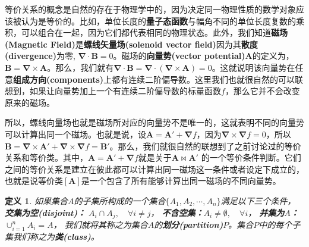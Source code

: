 \documentclass[mathserif,hyperref,UTF8,openany,b5paper]{ctexbook}
\newtheorem{defn}{定义}[section]
\begin{document}
等价关系的概念是自然的存在于物理学中的，因为决定同一物理性质的数学对象应该被认为是等价的。比如，单位长度的\textbf{量子态函数}与幅角不同的单位长度复数的乘积，可以组合在一起，因为它们都代表相同的物理状态。此外，我们知道\textbf{磁场(Magnetic Field)}是\textbf{螺线矢量场(solenoid vector field)}因为其\textbf{散度(divergence)}为零, $\mathbf{\nabla} \cdot \mathbf{B} = 0 $。磁场的\textbf{向量势(vector potential)}$\mathbf{A}$的定义为，$ \mathbf{B} = \mathbf{\nabla} \times \mathbf{A}$。那么，我们就有$\mathbf{\nabla} \cdot \mathbf{B} =\mathbf{\nabla} \cdot (\mathbf{\nabla} \times \mathbf{A}) = 0$。这就说明该向量势在任意\textbf{组成方向(components)}上都有连续二阶偏导数。这里我们也就很自然的可以联想到，如果让向量势加上一个有连续二阶偏导数的标量函数$f$，那么它并不会改变原来的磁场。 

所以，螺线向量场也就是磁场所对应的向量势不是唯一的，这就表明不同的向量势可以计算出同一个磁场。也就是说，设$\mathbf{A} = \mathbf{A'} + \mathbf{\nabla} f$，因为$\mathbf{\nabla} \times \mathbf{\nabla} f=0$，所以$\mathbf{B} =\mathbf{\nabla} \times \mathbf{ A' }+ \mathbf{\nabla} \times \mathbf{\nabla} f = \mathbf{B'}$。那么，我们就很自然的联想到了之前讨论过的等价关系和等价类。其中，$\mathbf{A} = \mathbf{A'} + \mathbf{\nabla} f$就是关于$\mathbf{A}     \bowtie\mathbf{A'}$ 的一个等价条件判断。它们之间的等价关系是建立在彼此都可以计算出同一磁场这一条件或者设定下成立的，也就是说等价类$[\mathbf{A}]$是一个包含了所有能够计算出同一磁场的不同向量势。
\begin{defn}
如果集合$A$的子集所构成的一个集合$\{A_1,A_2,\cdots,A_n\}$满足以下三个条件，
\textbf{交集为空(disjoint)：} $A_i \cap A_j,\quad \forall i \not = j$，
\textbf{不含空集：}$A_i \not = \emptyset , \quad \forall i$，
\textbf{并集为$A$：}$\cup_{i=1}^{n}A_{i} =A$，
我们就将其称之为集合$A$的\textbf{划分(partition)}$P$。集合$P$中的每个子集我们称之为\textbf{类(class)}。
\end{defn}
\end{document}
